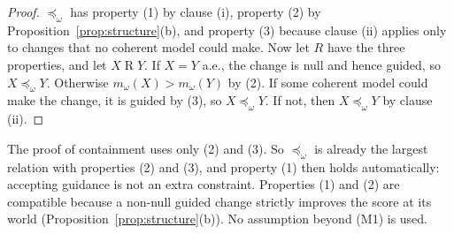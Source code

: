 \documentclass[11pt]{article}
\theoremstyle{plain}
\theoremstyle{definition}
\theoremstyle{remark}
\begin{document}
\begin{proof}
$\preceq_\omega$ has property (1) by clause (i), property (2) by
Proposition~\ref{prop:structure}(b), and property (3) because clause (ii) applies only to
changes that no coherent model could make. Now let $R$ have the three properties, and let
$X\mathrel RY$. If $X=Y$ a.e., the change is null and hence guided, so $X\preceq_\omega Y$.
Otherwise $m_\omega(X)>m_\omega(Y)$ by (2). If some coherent model could make the change, it is
guided by (3), so $X\preceq_\omega Y$. If not, then $X\preceq_\omega Y$ by clause (ii).
\end{proof}

The proof of containment uses only (2) and (3). So $\preceq_\omega$ is already the largest
relation with properties (2) and (3), and property (1) then holds automatically: accepting
guidance is not an extra constraint. Properties (1) and (2) are compatible because a non-null
guided change strictly improves the score at its world (Proposition~\ref{prop:structure}(b)).
No assumption beyond (M1) is used.
\end{document}
